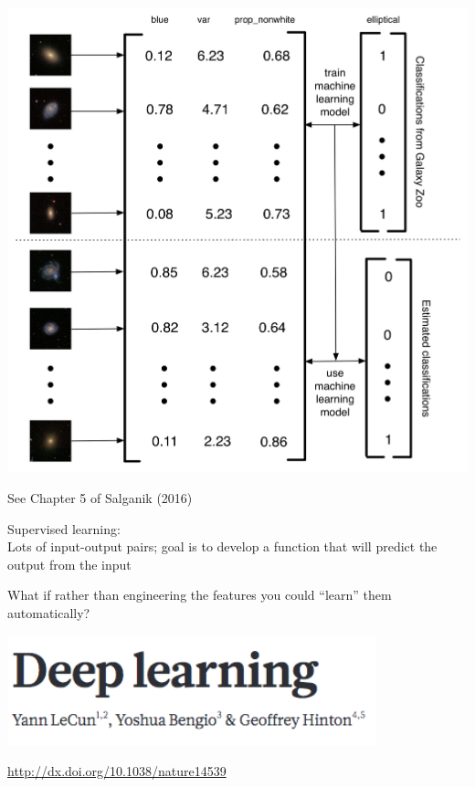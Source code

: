 \documentclass[aspectratio=169]{beamer}
\def\vf{\vfill}
\begin{document}
\begin{frame}

\begin{center}
\includegraphics[height=0.9\textheight]{figures/gz_banerji_schematic}
\end{center}
\vf
See Chapter 5 of Salganik (2016)
\end{frame}
\begin{frame}

Supervised learning:\\
Lots of input-output pairs; goal is to develop a function that will predict the output from the input

\end{frame}
\begin{frame}

\Large{
\begin{center}
What if rather than engineering the features you could ``learn'' them automatically?
\end{center}
}
\end{frame}
\begin{frame}

\begin{center}
\includegraphics[width=0.8\textwidth]{figures/lecunn_deep_2015}
\end{center}
\vf
\url{http://dx.doi.org/10.1038/nature14539}
\end{frame}
\end{document}
